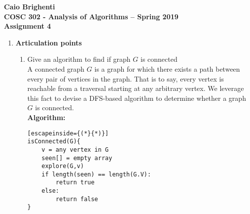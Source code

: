 \documentclass{article}
\begin{document}
\noindent \textbf{Caio Brighenti }\\
\noindent \textbf{COSC 302 - Analysis of Algorithms -- Spring 2019}\\%
\noindent \textbf{Assignment 4}\vspace{1em}\\
\begin{enumerate}
	\item \textbf{Articulation points}
	\begin{enumerate}
		\item Give an algorithm to find if graph $G$ is connected
		\\ A connected graph $G$ is a graph for which there exists a path between every pair of vertices in the graph. That is to say, every vertex is reachable from a traversal starting at any arbitrary vertex. We leverage this fact to devise a DFS-based algorithm to determine whether a graph $G$ is connected.
		\\ \textbf{Algorithm:}
		\begin{lstlisting}[escapeinside={(*}{*)}]
isConnected(G){
	v = any vertex in G
	seen[] = empty array
	explore(G,v)
	if length(seen) == length(G.V):
		return true
	else:
		return false			
}


\end{lstlisting}
\end{enumerate}
\end{enumerate}
\end{document}
